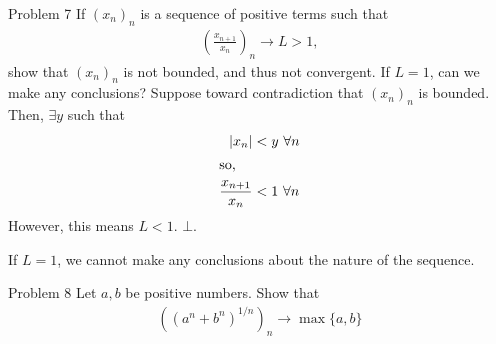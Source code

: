 \documentclass[8pt]{extarticle}
\begin{document}
  \begin{problem}{Problem 7}
    If $(x_n)_n$ is a sequence of positive terms such that
    \begin{align*}
      \left(\frac{x_{n+1}}{x_n}\right)_n \xrightarrow{} L > 1,
    \end{align*}
    show that $(x_n)_n$ is not bounded, and thus not convergent. If $L = 1$, can we make any conclusions?
    \tcblower
    Suppose toward contradiction that $(x_n)_n$ is bounded. Then, $\exists y$ such that
    \begin{align*}
      |x_n| &< y~\forall n\\
      \shortintertext{so,}
      \frac{x_{n+1}}{x_n} &< 1~\forall n
    \end{align*}
    However, this means $L < 1$. $\bot$.\newline

    If $L = 1$, we cannot make any conclusions about the nature of the sequence.
  \end{problem}
  \begin{problem}{Problem 8}
    Let $a,b$ be positive numbers. Show that
    \begin{align*}
      \left((a^n + b^n)^{1/n}\right)_n \rightarrow \max\{a,b\}
    \end{align*}
    \tcblower

  \end{problem}
\end{document}
